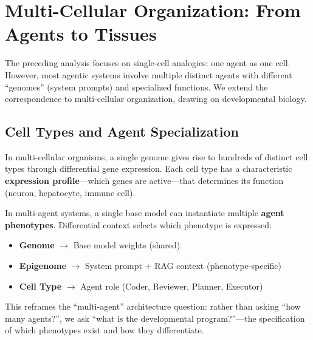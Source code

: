 \section{Multi-Cellular Organization: From Agents to Tissues}\label{sec:multi-cellular}

The preceding analysis focuses on single-cell analogies: one agent as one cell. However, most agentic systems
involve multiple distinct agents with different ``genomes'' (system prompts) and specialized functions. We extend
the correspondence to multi-cellular organization, drawing on developmental biology.

\subsection{Cell Types and Agent Specialization}

In multi-cellular organisms, a single genome gives rise to hundreds of distinct cell types through differential
gene expression. Each cell type has a characteristic \textbf{expression profile}---which genes are active---that
determines its function (neuron, hepatocyte, immune cell).

In multi-agent systems, a single base model can instantiate multiple \textbf{agent phenotypes}. Differential
context selects which phenotype is expressed:
\begin{itemize}[leftmargin=*]
\item \textbf{Genome} $\to$ Base model weights (shared)
\item \textbf{Epigenome} $\to$ System prompt + RAG context (phenotype-specific)
\item \textbf{Cell Type} $\to$ Agent role (Coder, Reviewer, Planner, Executor)
\end{itemize}

This reframes the ``multi-agent'' architecture question: rather than asking ``how many agents?'', we ask
``what is the developmental program?''---the specification of which phenotypes exist and how they differentiate.


